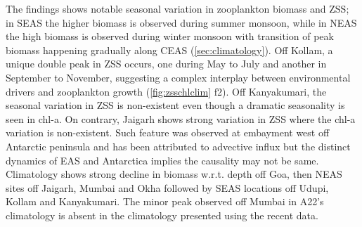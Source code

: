 \documentclass{article}
\begin{document}
	The findings shows notable seasonal variation in zooplankton biomass and ZSS; in SEAS the higher biomass is observed during summer monsoon, while in NEAS the high biomass is observed during winter monsoon with transition of peak biomass happening gradually along CEAS (\cref{sec:climatology}). Off Kollam, a unique double peak in ZSS occurs, one during May to July and another in September to November, suggesting a complex interplay between environmental drivers and zooplankton growth (\cref{fig:zsschlclim} f2). Off Kanyakumari, the seasonal variation in ZSS is non-existent even though a dramatic seasonality is seen in chl-a. On contrary, Jaigarh shows strong variation in ZSS where the chl-a variation is non-existent. Such feature was observed at embayment west off Antarctic peninsula and has been attributed to advective influx \citep{espinasse2012austral} but the distinct dynamics of EAS and Antarctica implies the causality may not be same. Climatology shows strong decline in biomass w.r.t. depth off Goa, then NEAS sites off Jaigarh, Mumbai and Okha followed by SEAS locations off Udupi, Kollam and Kanyakumari. The minor peak observed off Mumbai in A22's climatology is absent in the climatology presented using the recent data.
	
\end{document}
